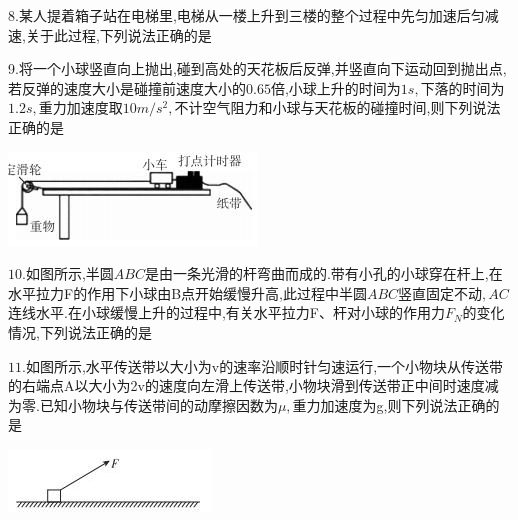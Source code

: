 \question[6]8.某人提着箱子站在电梯里,电梯从一楼上升到三楼的整个过程中先匀加速后匀减速,关于此过程,下列说法正确的是
\begin{solution}{4cm}

\end{solution}



\question[6]9.将一个小球竖直向上抛出,碰到高处的天花板后反弹,并竖直向下运动回到抛出点,若反弹的速度大小是碰撞前速度大小的$0.65$倍,小球上升的时间为$1s,$下落的时间为$1.2s,$重力加速度取$10m/s^2,$不计空气阻力和小球与天花板的碰撞时间,则下列说法正确的是
\begin{center}
\includegraphics[]{img/image9.jpeg}
\end{center}

\begin{solution}{4cm}

\end{solution}



\question[6]$10.$如图所示,半圆$ABC$是由一条光滑的杆弯曲而成的.带有小孔的小球穿在杆上,在水平拉力F的作用下小球由B点开始缓慢升高,此过程中半圆$ABC$竖直固定不动$,AC$连线水平.在小球缓慢上升的过程中,有关水平拉力F、杆对小球的作用力$F_N$的变化情况,下列说法正确的是
\begin{solution}{4cm}

\end{solution}



\question[6]$11.$如图所示,水平传送带以大小为v的速率沿顺时针匀速运行,一个小物块从传送带的右端点A以大小为2v的速度向左滑上传送带,小物块滑到传送带正中间时速度减为零.已知小物块与传送带间的动摩擦因数为$\mu,$重力加速度为g,则下列说法正确的是
\begin{center}
\includegraphics[]{img/image11.jpeg}
\end{center}

